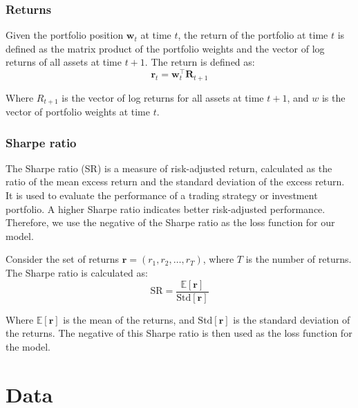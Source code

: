 \documentclass[12pt]{article}
\begin{document}
\subsubsection*{Returns}

Given the portfolio position $\mathbf{w}_t$ at time $t$, the return of the portfolio at time $t$ is defined as the matrix product of the portfolio weights and the vector of log returns of all assets at time $t+1$. The return is defined as:
\begin{equation}
    \mathbf{r}_t = \mathbf{w}_t^\top \mathbf{R}_{t+1}
    \label{eq:returns}
\end{equation}

Where $R_{t+1}$ is the vector of log returns for all assets at time $t+1$, and $w$ is the vector of portfolio weights at time $t$. 

\subsubsection*{Sharpe ratio}

The Sharpe ratio (SR) is a measure of risk-adjusted return, calculated as the ratio of the mean excess return and the standard deviation of the excess return. It is used to evaluate the performance of a trading strategy or investment portfolio. A higher Sharpe ratio indicates better risk-adjusted performance. Therefore, we use the negative of the Sharpe ratio as the loss function for our model. 

Consider the set of returns $\mathbf{r} = (r_1, r_2, \ldots, r_T)$, where $T$ is the number of returns. The Sharpe ratio is calculated as:
\begin{equation}
    \text{SR} = \frac{\mathbb{E}[\mathbf{r}]}{\text{Std}[\mathbf{r}]}    
    \label{eq:sharpe_ratio}
\end{equation}

Where $\mathbb{E}[\mathbf{r}]$ is the mean of the returns, and $\text{Std}[\mathbf{r}]$ is the standard deviation of the returns. The negative of this Sharpe ratio is then used as the loss function for the model.

\clearpage






\section{Data}
\end{document}
